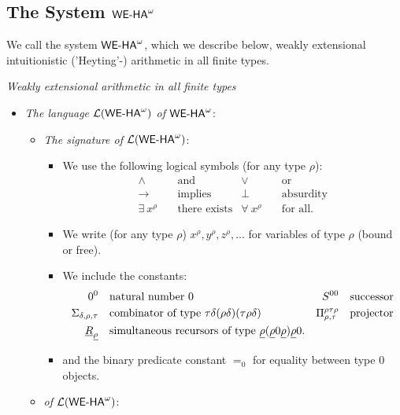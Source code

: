 \subsection{The System ${\textsf{\upshape WE-HA}}^{\omega}$}
%
%
%
We call the system ${\textsf{\upshape WE-HA}}^{\omega}$, which we describe below, weakly
extensional intuitionistic ('Heyting'-) arithmetic in all finite
types. 
\begin{dfn}{\em Weakly extensional arithmetic in all finite types }
  \label{d:weha}
  \begin{itemize}
  \item {\em The language ${\mathcal{L}}({\textsf{\upshape WE-HA}}^{\omega})$ of ${\textsf{\upshape WE-HA}}^{\omega}$}:  
    \begin{itemize}
    \item {\em The signature of ${\mathcal{L}}({\textsf{\upshape WE-HA}}^{\omega})$}:  
      \begin{itemize}
      \item We use the following logical symbols (for any type $\rho$):
        \begin{align*}
          \wedge\quad &\text{and}&            \vee  \quad &\text{or}\\
          \rightarrow\quad &\text{implies}&    \perp\quad &\text{absurdity}\\
          \exists\ x^\rho\quad &\text{there exists}&        \forall\ x^\rho\quad &\text{for all}
          \text{.}\end{align*}
      \item We write (for any type $\rho$) $x^\rho,y^\rho,z^\rho,... $
            for variables of type $\rho$ (bound or free).
      \item We include the constants: 
        \begin{align*}
          0^0\quad &\text{natural number $0$}&  S^{00}\quad &\text{successor}\\
          \Sigma_{\delta,\rho,\tau}\quad 
                &\text{combinator of type $\tau\delta(\rho\delta)(\tau\rho\delta)$}&
          \Pi^{\rho\tau\rho}_{\rho,\tau}\quad &\text{projector}\\    
          \underline R_{\underline \rho}\quad &\text{simultaneous recursors of type 
           $\underline\rho(\underline\rho 0\underline\rho)\underline\rho0$}\text{.}&&
          \end{align*}
      \item and the binary predicate constant $=_0$ for equality between type $0$ objects.
       \end{itemize}
     \item {\em {} of ${\mathcal{L}}({\textsf{\upshape WE-HA}}^{\omega})$}:

\end{itemize}
\end{itemize}
\end{dfn}
